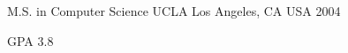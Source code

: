 

\begin{cventries}

  \cventry
    {M.S. in Computer Science} %
    {UCLA} %
    {Los Angeles, CA USA} %
    {2004} %
    {
      \begin{cvitems} %
        \item {GPA 3.8}
      \end{cvitems}
    }

\end{cventries}
